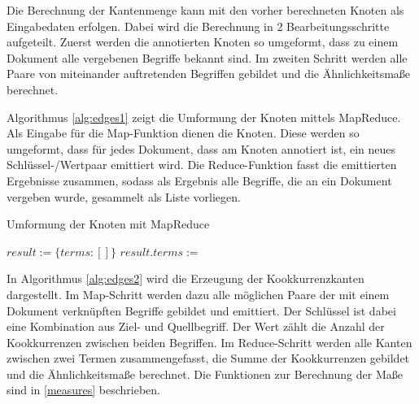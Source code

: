 Die Berechnung der Kantenmenge kann mit den vorher berechneten Knoten als Eingabedaten erfolgen. Dabei wird die Berechnung in 2 Bearbeitungsschritte aufgeteilt. Zuerst werden die annotierten Knoten so umgeformt, dass zu einem Dokument alle vergebenen Begriffe bekannt sind. Im zweiten Schritt werden alle Paare von miteinander auftretenden Begriffen gebildet und die Ähnlichkeitsmaße berechnet.

Algorithmus \ref{alg:edges1} zeigt die Umformung der Knoten mittels MapReduce. Als Eingabe für die Map-Funktion dienen die Knoten. Diese werden so umgeformt, dass für jedes Dokument, dass am Knoten annotiert ist, ein neues Schlüssel-/Wertpaar emittiert wird. Die Reduce-Funktion fasst die emittierten Ergebnisse zusammen, sodass als Ergebnis alle Begriffe, die an ein Dokument vergeben wurde, gesammelt als Liste vorliegen.

\begin{algorithm}
\caption{Umformung der Knoten mit MapReduce
    \label{alg:edges1}}
    \begin{algorithmic}[1]
                \State {}
            \EndFor
        \EndFunction
        \Statex
            \State $result := \{terms: []\}$
                \State $result.terms :=$ 
            \EndFor
            \State {}
        \EndFunction
        \Statex
    \end{algorithmic}
\end{algorithm}

In Algorithmus \ref{alg:edges2} wird die Erzeugung der Kookkurrenzkanten dargestellt. Im Map-Schritt werden dazu alle möglichen Paare der mit einem Dokument verknüpften Begriffe gebildet und emittiert. Der Schlüssel ist dabei eine Kombination aus Ziel- und Quellbegriff. Der Wert zählt die Anzahl der Kookkurrenzen zwischen beiden Begriffen. Im Reduce-Schritt werden alle Kanten zwischen zwei Termen zusammengefasst, die Summe der Kookkurrenzen gebildet und die Ähnlichkeitsmaße berechnet. Die Funktionen zur Berechnung der Maße sind in \ref{measures} beschrieben.

